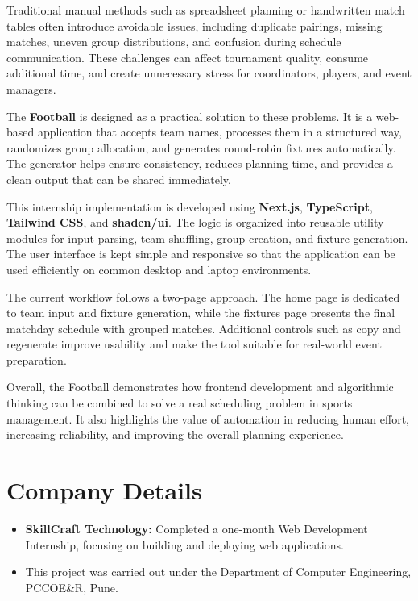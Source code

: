\documentclass[12pt,a4paper]{report}
\begin{document}
Traditional manual methods such as spreadsheet planning or handwritten match tables often introduce avoidable issues, including duplicate pairings, missing matches, uneven group distributions, and confusion during schedule communication. These challenges can affect tournament quality, consume additional time, and create unnecessary stress for coordinators, players, and event managers.

The \textbf{Football } is designed as a practical solution to these problems. It is a web-based application that accepts team names, processes them in a structured way, randomizes group allocation, and generates round-robin fixtures automatically. The generator helps ensure consistency, reduces planning time, and provides a clean output that can be shared immediately.

This internship implementation is developed using \textbf{Next.js}, \textbf{TypeScript}, \textbf{Tailwind CSS}, and \textbf{shadcn/ui}. The logic is organized into reusable utility modules for input parsing, team shuffling, group creation, and fixture generation. The user interface is kept simple and responsive so that the application can be used efficiently on common desktop and laptop environments.

The current workflow follows a two-page approach. The home page is dedicated to team input and fixture generation, while the fixtures page presents the final matchday schedule with grouped matches. Additional controls such as copy and regenerate improve usability and make the tool suitable for real-world event preparation.

Overall, the Football  demonstrates how frontend development and algorithmic thinking can be combined to solve a real scheduling problem in sports management. It also highlights the value of automation in reducing human effort, increasing reliability, and improving the overall planning experience.

\section{Company Details}
\begin{itemize}
    \item \textbf{SkillCraft Technology:}
    Completed a one-month Web Development Internship, focusing on building and deploying web applications.

    \item
    This project was carried out under the Department of Computer Engineering, PCCOE\&R, Pune.
\end{itemize}
\end{document}
